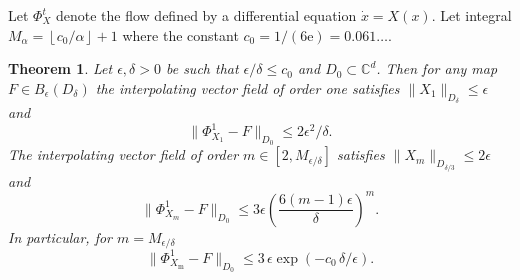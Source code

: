 \documentclass[a4paper,12pt]{article}
\newcommand{\C}{\mathbb{C}}
\newtheorem{thm}{Theorem}
\begin{document}
Let $\Phi^t_X$ denote the flow defined by a differential equation $\dot x=X(x)$.
Let  integral $M_{\alpha}=\left\lfloor c_0/\alpha\right\rfloor+1
$ where the constant $c_0=1/(6\mathrm e)= 0.061\dots$.

\begin{thm}\label{Thm:alaNeishtadt}
Let $\epsilon,\delta>0$ be such that $\epsilon/\delta \le c_0$ and $D_0\subset \C^d$.
Then for any map $F\in B_{\epsilon}(D_\delta)$  the interpolating vector field 
of order one satisfies $\|X_1\|_{D_\delta}\le\epsilon $ and  
\begin{equation}
   \bigl\|\Phi^1_{X_1}-F \bigr\|_{D_0} 
  \le 2\epsilon^2/\delta.
\end{equation}
The interpolating vector field of order $m\in [2,M_{\epsilon/\delta}]$ satisfies $\|X_m\|_{D_{\delta/3}}
  \le 2\epsilon $ and
\begin{equation}\label{Eq:Phi-f}
    \bigl\|\Phi^1_{X_m}-F \bigr\|_{D_0} 
  \le   
    3\epsilon  \left( \frac{6 (m-1)\epsilon}{\delta}\right)^{m} .
\end{equation}
In particular, for $\displaystyle m =M_{\epsilon/\delta} $ 
\begin{equation}\label{Eq:expbound}
\bigl \|\Phi^1_{X_{\mathrm{m}}}-F \bigr\|_{D_0}\le 
3\,\epsilon \exp\left(- c_0\, \delta /\epsilon\right).
\end{equation}
\end{thm}
\end{document}
